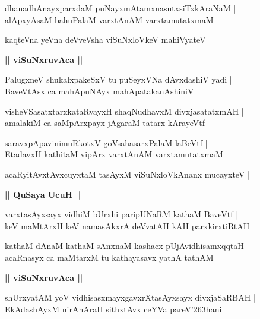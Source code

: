 \documentclass[twoside,12pt,openright]{book}
\def\S{\char'263}
\newcounter{shloka}[chapter]
\def\uvaca#1{\centerline{{\large\textbf{#1}}}}
\begin{document}
\begin{shloka}%
dhanadhAnayxparxdaM puNayxmAtamxnasutxsiTxkAraNaM |\\
alApxyAsaM bahuPalaM varxtAnAM varxtamutatxmaM
\end{shloka}

\begin{shloka}%
kaqteVna yeVna deVveVsha viSuNxloVkeV mahiVyateV 	
\end{shloka}

\uvaca{|| viSuNxruvAca ||}

\begin{shloka}%
PalugxneV shukalxpakeSxV tu puSeyxVNa dAvxdashiV yadi |\\
BaveVtAsx ca mahApuNAyx mahApatakanAshiniV 
\end{shloka}

\begin{shloka}%
visheVSasatxtarxkataRvayxH shaqNudhavxM divxjasatatxmAH |\\
amalakiM ca saMpArxpayx jAgaraM tatarx kArayeVtf
\end{shloka}

\begin{shloka}%
saravxpApavinimuRkotxV goVsahasarxPalaM laBeVtf |\\
EtadavxH kathitaM vipArx varxtAnAM varxtamutatxmaM
\end{shloka}

\begin{shloka}%
acaRyitAvxtAvxcuyxtaM tasAyxM viSuNxloVkAnanx mucayxteV |\\
\end{shloka}

\uvaca{|| QuSaya UcuH ||}

\begin{shloka}%
varxtasAyxsayx vidhiM bUrxhi paripUNaRM kathaM BaveVtf |\\
keV maMtArxH keV namasAkxrA deVvatAH kAH parxkirxtiRtAH
\end{shloka}

\begin{shloka}%
kathaM dAnaM kathaM sAnxnaM kashacx pUjAvidhisamxqqtaH |\\
acaRnasyx ca maMtarxM tu kathayasavx yathA tathAM 
\end{shloka}

\uvaca{|| viSuNxruvAca ||}

\begin{shloka}%
shUrxyatAM yoV vidhisasxmayxgavxrXtasAyxsayx divxjaSaRBAH |\\
EkAdashAyxM nirAhAraH sithxtAvx ceYVa pareV\S hani
\end{shloka}
\end{document}
